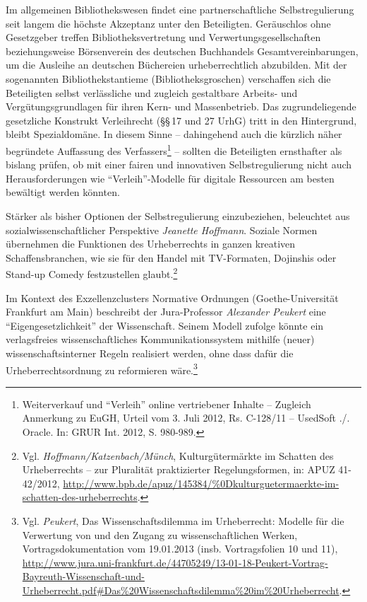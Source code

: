 \documentclass[output=paper]{langscibook}
\begin{document}
Im allgemeinen Bibliothekswesen findet eine partnerschaftliche
Selbstregulierung seit langem die höchste Akzeptanz unter den
Beteiligten. Geräuschlos ohne Gesetzgeber treffen Bibliotheksvertretung
und Verwertungsgesellschaften beziehungsweise Börsenverein des deutschen
Buchhandels Gesamtvereinbarungen, um die Ausleihe an deutschen
Büchereien urheberrechtlich abzubilden. Mit der sogenannten
Bibliothekstantieme (Bibliotheksgroschen) verschaffen sich die
Beteiligten selbst verlässliche und zugleich gestaltbare Arbeits- und
Vergütungsgrundlagen für ihren Kern- und Massenbetrieb. Das
zugrundeliegende gesetzliche Konstrukt Verleihrecht (§§\,17 und 27 UrhG)
tritt in den Hintergrund, bleibt Spezialdomäne. In diesem Sinne --
dahingehend auch die kürzlich näher begründete Auffassung des
Verfassers\footnote{Weiterverkauf und \enquote{Verleih} online
  vertriebener Inhalte -- Zugleich Anmerkung zu EuGH, Urteil vom 3. Juli
  2012, Rs. C-128/11 -- UsedSoft ./. Oracle. In: GRUR Int. 2012, S.
  980-989.} -- sollten die Beteiligten ernsthafter als bislang prüfen,
ob mit einer fairen und innovativen Selbstregulierung nicht auch
Herausforderungen wie \enquote{Verleih}-Modelle für digitale Ressourcen
am besten bewältigt werden könnten.

Stärker als bisher Optionen der Selbstregulierung einzubeziehen,
beleuchtet aus sozialwissenschaftlicher Perspektive \emph{Jeanette
Hoffmann}. Soziale Normen übernehmen die Funktionen des Urheberrechts in
ganzen kreativen Schaffensbranchen, wie sie für den Handel mit
TV-Formaten, Dojinshis oder Stand-up Comedy festzustellen
glaubt.\footnote{Vgl. \emph{Hoffmann/Katzenbach/Münch},
  Kulturgütermärkte im Schatten des Urheberrechts -- zur Pluralität
  praktizierter Regelungsformen, in: APUZ 41-42/2012,
  \url{http://www.bpb.de/apuz/145384/\%0Dkulturguetermaerkte-im-schatten-des-urheberrechts}.}

Im Kontext des Exzellenzclusters Normative Ordnungen (Goethe-Universität
Frankfurt am Main) beschreibt der Jura-Professor \emph{Alexander
Peukert} eine \enquote{Eigengesetzlichkeit} der Wissenschaft. Seinem
Modell zufolge könnte ein verlagsfreies wissenschaftliches
Kommunikationssystem mithilfe (neuer) wissenschaftsinterner Regeln
realisiert werden, ohne dass dafür die Urheberrechtsordnung zu
reformieren wäre.\footnote{Vgl. \emph{Peukert}, Das Wissenschaftsdilemma
  im Urheberrecht: Modelle für die Verwertung von und den Zugang zu
  wissenschaftlichen Werken, Vortragsdokumentation vom 19.01.2013 (insb.
  Vortragsfolien 10 und 11),
  \url{http://www.jura.uni-frankfurt.de/44705249/13-01-18-Peukert-Vortrag-Bayreuth-Wissenschaft-und-Urheberrecht.pdf\#Das\%20Wissenschaftsdilemma\%20im\%20Urheberrecht}.}
\end{document}
